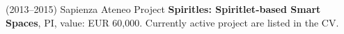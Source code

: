 (2013--2015) Sapienza Ateneo Project \textbf{Spiritles: Spiritlet-based Smart Spaces}, PI, value: EUR 60,000.
Currently active project are listed in the CV.





